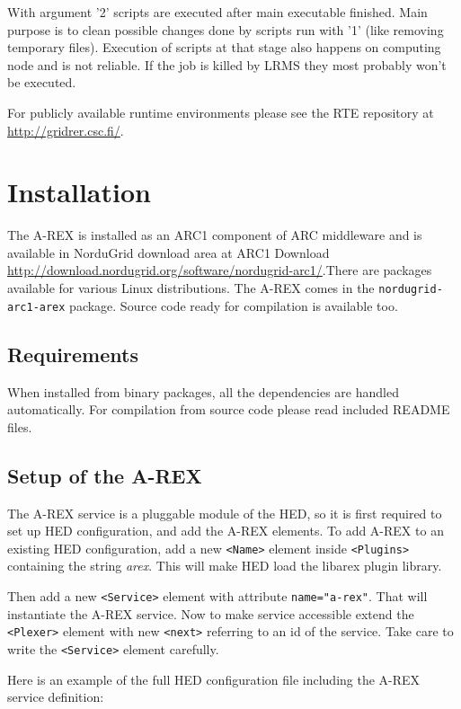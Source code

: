 \documentclass{article}                            %
\begin{document}
With argument '2' scripts are executed after main executable finished.
Main purpose is to clean possible changes done by scripts run with
'1' (like removing temporary files). Execution of scripts at that
stage also happens on computing node and is not reliable. If the job
is killed by LRMS they most probably won't be executed.

For publicly available runtime environments please see the RTE repository at \url{http://gridrer.csc.fi/}.

\section{Installation\label{sec:installation}}

The A-REX is installed as an ARC1 component of ARC middleware and is available
in NorduGrid download area at ARC1 Download \url{http://download.nordugrid.org/software/nordugrid-arc1/}.There are packages available for various Linux distributions. The
A-REX comes in the \texttt{nordugrid-arc1-arex} package. Source code ready for
compilation is available too.

\subsection{Requirements}

When installed from binary packages, all the dependencies are handled automatically.
For compilation from source code please read included README files.


\subsection{Setup of the A-REX}

The A-REX service is a pluggable module of the HED, so it is first
required to set up HED configuration, and add the A-REX elements. To
add A-REX to an existing HED configuration, add a new \verb|<Name>|
element inside \verb|<Plugins>| containing the string
\emph{arex}. This will make HED load the libarex plugin library.

Then add a new \verb|<Service>| element with attribute
\verb|name="a-rex"|. That will instantiate the A-REX service. Now to
make service accessible extend the \verb|<Plexer>| element with new
\verb|<next>| referring to an id of the service. Take care to write
the \verb|<Service>| element carefully.

Here is an example of the full HED configuration file including the
A-REX service definition:
\end{document}
